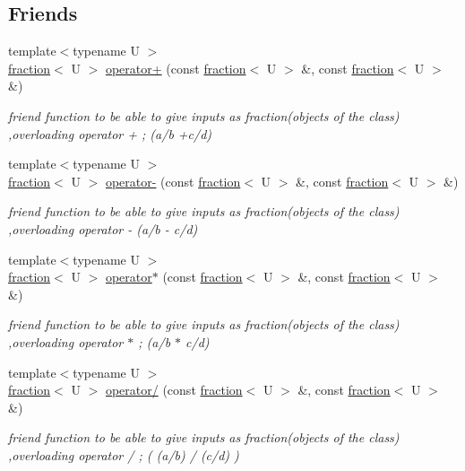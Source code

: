 \subsection*{Friends}
\begin{DoxyCompactItemize}
\item 
{\footnotesize template$<$typename U $>$ }\\\hyperlink{classfraction}{fraction}$<$ U $>$ \hyperlink{classfraction_a0d56e8a8a2cb2fcdb18bf992d35dcbb8}{operator+} (const \hyperlink{classfraction}{fraction}$<$ U $>$ \&, const \hyperlink{classfraction}{fraction}$<$ U $>$ \&)
\begin{DoxyCompactList}\small\item\em friend function to be able to give inputs as fraction(objects of the class) ,overloading operator + ; (a/b +c/d) \end{DoxyCompactList}\item 
{\footnotesize template$<$typename U $>$ }\\\hyperlink{classfraction}{fraction}$<$ U $>$ \hyperlink{classfraction_a35242050e665b8b85494a31d90b4edaf}{operator-\/} (const \hyperlink{classfraction}{fraction}$<$ U $>$ \&, const \hyperlink{classfraction}{fraction}$<$ U $>$ \&)
\begin{DoxyCompactList}\small\item\em friend function to be able to give inputs as fraction(objects of the class) ,overloading operator -\/ (a/b -\/ c/d) \end{DoxyCompactList}\item 
{\footnotesize template$<$typename U $>$ }\\\hyperlink{classfraction}{fraction}$<$ U $>$ \hyperlink{classfraction_a70aef516b86d3edb07367dfb024d5d84}{operator$\ast$} (const \hyperlink{classfraction}{fraction}$<$ U $>$ \&, const \hyperlink{classfraction}{fraction}$<$ U $>$ \&)
\begin{DoxyCompactList}\small\item\em friend function to be able to give inputs as fraction(objects of the class) ,overloading operator $\ast$ ; (a/b $\ast$ c/d) \end{DoxyCompactList}\item 
{\footnotesize template$<$typename U $>$ }\\\hyperlink{classfraction}{fraction}$<$ U $>$ \hyperlink{classfraction_a48ddf8e26023e5842137fdcfe502cb47}{operator/} (const \hyperlink{classfraction}{fraction}$<$ U $>$ \&, const \hyperlink{classfraction}{fraction}$<$ U $>$ \&)
\begin{DoxyCompactList}\small\item\em friend function to be able to give inputs as fraction(objects of the class) ,overloading operator / ; ( (a/b) / (c/d) ) \end{DoxyCompactList}\item 

\end{DoxyCompactItemize}
